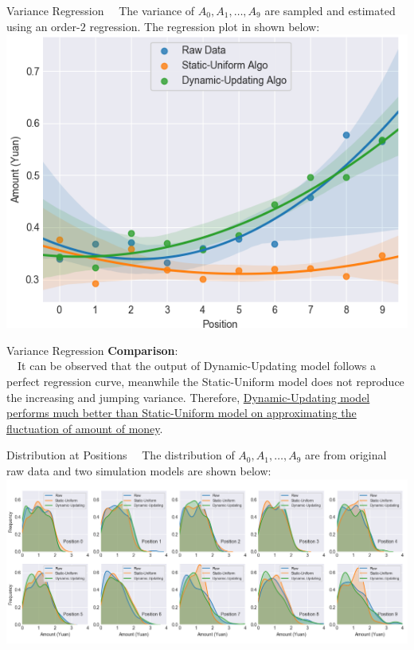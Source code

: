 \documentclass[12pt]{beamer}
\renewcommand{\[}{\begin{equation*} \begin{aligned}} %
\renewcommand{\]}{\end{aligned} \end{equation*}}
\begin{document}
\begin{frame}{Variance Regression}
	\ \ The variance of $A_0, A_1, \dots , A_9$ are sampled and estimated using an order-$2$ regression. The regression plot in shown below: \\[10pt]
	\centering
	\includegraphics[scale=0.5]{result2.png}
\end{frame}

\begin{frame}{Variance Regression}
	\textbf{Comparison}: \\
	\ \ It can be observed that the output of Dynamic-Updating model follows a perfect regression curve, meanwhile the Static-Uniform model does not reproduce the increasing and jumping variance. Therefore, \uline{Dynamic-Updating model performs much better than Static-Uniform model on approximating the fluctuation of amount of money}.
\end{frame}

\begin{frame}{Distribution at Positions}
	\ \ The distribution of $A_0, A_1, \dots , A_9$ are from original raw data and two simulation models are shown below: \\[10pt]
	\centering
	\includegraphics[scale=0.35]{result3.png}
\end{frame}
\end{document}
